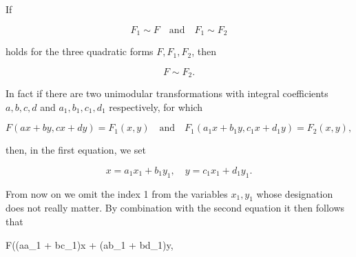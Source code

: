 If

$$F_1 \sim F \quad \text{and} \quad F_1 \sim F_2$$

holds for the three quadratic forms $F, F_1, F_2$, then

$$F \sim F_2.$$

In fact if there are two unimodular transformations with integral coefficients $a, b, c, d$ and $a_1, b_1, c_1, d_1$ respectively, for which

$$F(ax + by, cx + dy) = F_1(x, y) \quad \text{and} \quad F_1(a_1x + b_1y, c_1x + d_1y) = F_2(x, y),$$

then, in the first equation, we set

$$x = a_1x_1 + b_1y_1, \quad y = c_1x_1 + d_1y_1.$$

From now on we omit the index 1 from the variables $x_1, y_1$ whose designation does not really matter. By combination with the second equation it then follows that

$$F((aa_1 + bc_1)x + (ab_1 + bd_1)y,
